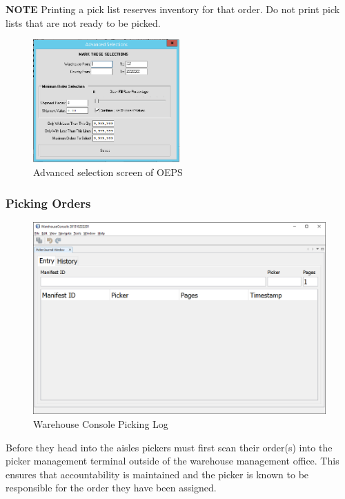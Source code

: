 \textbf{NOTE} Printing a pick list reserves inventory for that order. Do not print pick lists that are not ready to be picked.

\begin{figure}[H]
	\centering
	\includegraphics[width=0.5\textwidth]{../img/image4}
	\caption{Advanced selection screen of OEPS}
\end{figure}

\subsubsection{Picking Orders}

\begin{figure}[H]
	\includegraphics[width=\textwidth]{../img/image51}
	\caption{Warehouse Console Picking Log}
\end{figure}

Before they head into the aisles pickers must first scan their order(s) into the picker management terminal outside of the warehouse management office.  This ensures that accountability is maintained and the picker is known to be responsible for the order they have been assigned.

